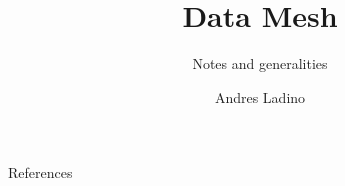 \documentclass[aspectratio=169]{beamer}
\title{Data Mesh}
\subtitle{Notes and generalities}
\author{Andres Ladino}
\institute{Talan}
\date{}
\begin{document}
\begin{frame}
    \maketitle
\end{frame}




\begin{frame}{References}
    \printbibliography
\end{frame}
\end{document}
